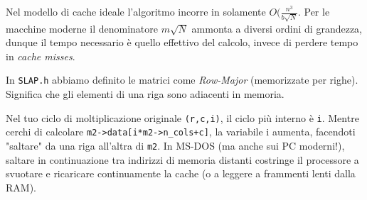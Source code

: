 \documentclass[10pt]{article}
\begin{document}
Nel modello di cache ideale l'algoritmo incorre in solamente $O(\frac{n^3}{b\sqrt{N}}$. Per le macchine moderne il denominatore $m\sqrt{N}$ ammonta a diversi ordini di grandezza, dunque il tempo necessario è quello effettivo del calcolo, invece di perdere tempo in \textit{cache misses}.

\bigskip

\dotfill

In \texttt{SLAP.h} abbiamo definito le matrici come \textit{Row-Major} (memorizzate per righe). Significa che gli elementi di una riga sono adiacenti in memoria.

Nel tuo ciclo di moltiplicazione originale \texttt{(r,c,i)}, il ciclo più interno è \texttt{i}.
Mentre cerchi di calcolare \texttt{m2->data[i*m2->n\_cols+c]}, la variabile i aumenta, facendoti "saltare" da una riga all'altra di \texttt{m2}.
In MS-DOS (ma anche sui PC moderni!), saltare in continuazione tra indirizzi di memoria distanti costringe il processore a svuotare e ricaricare continuamente la cache (o a leggere a frammenti lenti dalla RAM).
\end{document}
